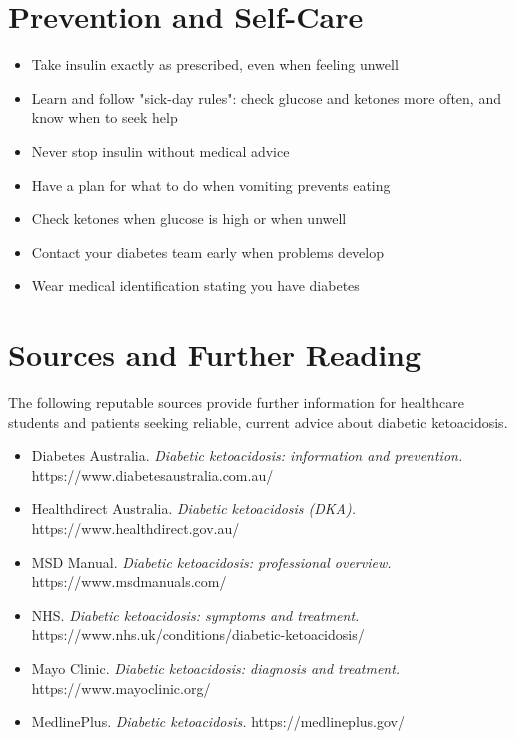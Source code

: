 \section*{Prevention and Self-Care}
\begin{itemize}
    \item Take insulin exactly as prescribed, even when feeling unwell
    \item Learn and follow "sick-day rules": check glucose and ketones more often, and know when to seek help
    \item Never stop insulin without medical advice
    \item Have a plan for what to do when vomiting prevents eating
    \item Check ketones when glucose is high or when unwell
    \item Contact your diabetes team early when problems develop
    \item Wear medical identification stating you have diabetes
\end{itemize}

\section*{Sources and Further Reading}
The following reputable sources provide further information for healthcare students and patients seeking reliable, current advice about diabetic ketoacidosis.

\begin{itemize}
    \item Diabetes Australia. \textit{Diabetic ketoacidosis: information and prevention.} https://www.diabetesaustralia.com.au/
    \item Healthdirect Australia. \textit{Diabetic ketoacidosis (DKA).} https://www.healthdirect.gov.au/
    \item MSD Manual. \textit{Diabetic ketoacidosis: professional overview.} https://www.msdmanuals.com/
    \item NHS. \textit{Diabetic ketoacidosis: symptoms and treatment.} https://www.nhs.uk/conditions/diabetic-ketoacidosis/
    \item Mayo Clinic. \textit{Diabetic ketoacidosis: diagnosis and treatment.} https://www.mayoclinic.org/
    \item MedlinePlus. \textit{Diabetic ketoacidosis.} https://medlineplus.gov/
\end{itemize}
